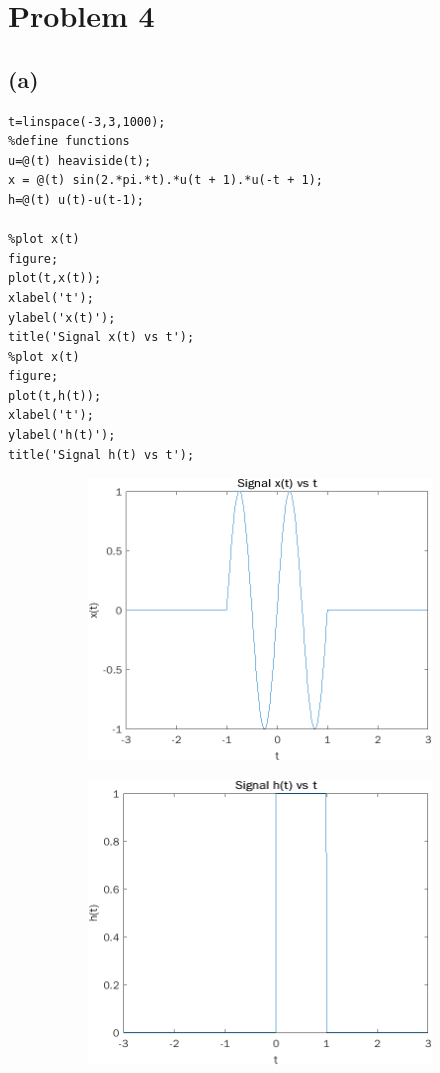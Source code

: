 \documentclass[12pt]{article}
\begin{document}
\section*{Problem 4}
\subsection*{(a)}
\begin{lstlisting}
t=linspace(-3,3,1000);
%define functions
u=@(t) heaviside(t);
x = @(t) sin(2.*pi.*t).*u(t + 1).*u(-t + 1);
h=@(t) u(t)-u(t-1);

%plot x(t)
figure;
plot(t,x(t));
xlabel('t');
ylabel('x(t)');
title('Signal x(t) vs t');
%plot x(t)
figure;
plot(t,h(t));
xlabel('t');
ylabel('h(t)');
title('Signal h(t) vs t');
\end{lstlisting}
\begin{figure}[h]
\centering
\begin{subfigure}{.5\textwidth}
  \centering
  \includegraphics[width=.9\linewidth]{4a1}
\end{subfigure}%
\begin{subfigure}{.5\textwidth}
  \centering
  \includegraphics[width=.9\linewidth]{4a2}
\end{subfigure}
\end{figure}
\end{document}
